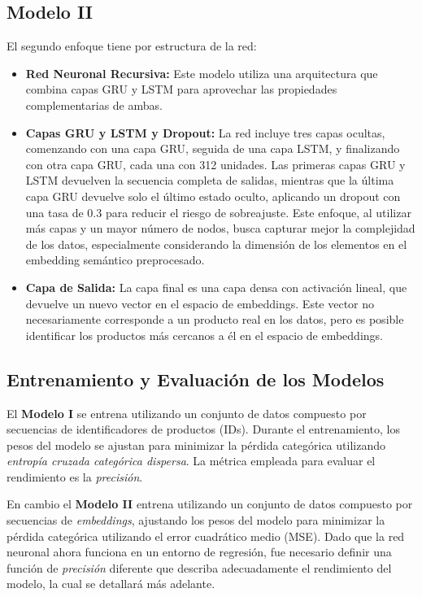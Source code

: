 \documentclass[runningheads]{llncs}
\begin{document}
	\subsection{Modelo II}
	El segundo enfoque tiene por estructura de la red:
	\begin{itemize}
		\item \textbf{Red Neuronal Recursiva:} Este modelo utiliza una arquitectura que combina capas GRU y LSTM para aprovechar las propiedades complementarias de ambas.
		
		\item \textbf{Capas GRU y LSTM y Dropout:} La red incluye tres capas ocultas, comenzando con una capa GRU, seguida de una capa LSTM, y finalizando con otra capa GRU, cada una con 312 unidades. Las primeras capas GRU y LSTM devuelven la secuencia completa de salidas, mientras que la última capa GRU devuelve solo el último estado oculto, aplicando un dropout con una tasa de $0.3$ para reducir el riesgo de sobreajuste. Este enfoque, al utilizar más capas y un mayor número de nodos, busca capturar mejor la complejidad de los datos, especialmente considerando la dimensión de los elementos en el embedding semántico preprocesado.
		
		\item \textbf{Capa de Salida:} La capa final es una capa densa con activación lineal, que devuelve un nuevo vector en el espacio de embeddings. Este vector no necesariamente corresponde a un producto real en los datos, pero es posible identificar los productos más cercanos a él en el espacio de embeddings.
	\end{itemize}

\subsection{Entrenamiento y Evaluación de los Modelos}

	El \textbf{Modelo I} se entrena utilizando un conjunto de datos compuesto por secuencias de identificadores de productos (IDs). Durante el entrenamiento, los pesos del modelo se ajustan para minimizar la pérdida categórica utilizando \textit{entropía cruzada categórica dispersa}. La métrica empleada para evaluar el rendimiento es la \textit{precisión}.

	En cambio el \textbf{Modelo II} entrena utilizando un conjunto de datos compuesto por secuencias de \textit{embeddings}, ajustando los pesos del modelo para minimizar la pérdida categórica utilizando el error cuadrático medio (MSE). Dado que la red neuronal ahora funciona en un entorno de regresión, fue necesario definir una función de \textit{precisión} diferente que describa adecuadamente el rendimiento del modelo, la cual se detallará más adelante.
    
\end{document}
